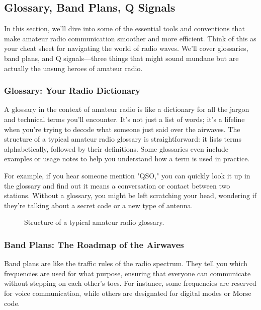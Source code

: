 \subsection{Glossary, Band Plans, Q Signals}
\label{subsec:glossary-band-q}

In this section, we'll dive into some of the essential tools and conventions that make amateur radio communication smoother and more efficient. Think of this as your cheat sheet for navigating the world of radio waves. We'll cover glossaries, band plans, and Q signals—three things that might sound mundane but are actually the unsung heroes of amateur radio.

\subsubsection*{Glossary: Your Radio Dictionary}
A glossary in the context of amateur radio is like a dictionary for all the jargon and technical terms you'll encounter. It’s not just a list of words; it’s a lifeline when you’re trying to decode what someone just said over the airwaves. The structure of a typical amateur radio glossary is straightforward: it lists terms alphabetically, followed by their definitions. Some glossaries even include examples or usage notes to help you understand how a term is used in practice.

For example, if you hear someone mention "QSO," you can quickly look it up in the glossary and find out it means a conversation or contact between two stations. Without a glossary, you might be left scratching your head, wondering if they’re talking about a secret code or a new type of antenna.

\begin{figure}[h!]
    \centering
    \caption{Structure of a typical amateur radio glossary.}
    \label{fig:glossary-structure}
\end{figure}

\subsubsection*{Band Plans: The Roadmap of the Airwaves}
Band plans are like the traffic rules of the radio spectrum. They tell you which frequencies are used for what purpose, ensuring that everyone can communicate without stepping on each other's toes. For instance, some frequencies are reserved for voice communication, while others are designated for digital modes or Morse code.


